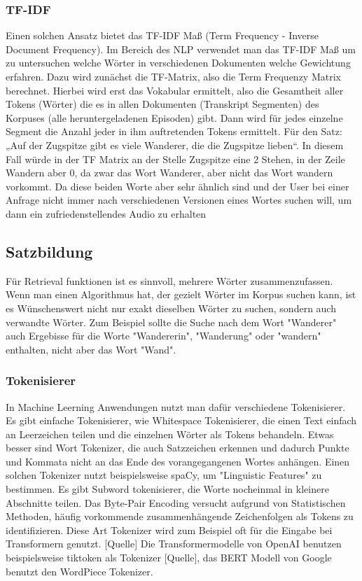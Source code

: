 \subsubsection{TF-IDF}

Einen solchen Ansatz bietet das TF-IDF Maß (Term Frequency - Inverse Document Frequency). 
Im Bereich des NLP verwendet man das TF-IDF Maß um zu untersuchen welche Wörter in verschiedenen Dokumenten welche Gewichtung erfahren. 
Dazu wird zunächst die TF-Matrix, also die Term Frequenzy Matrix berechnet. 
Hierbei wird erst das Vokabular ermittelt, also die Gesamtheit aller Tokens (Wörter) die es in allen Dokumenten (Transkript Segmenten) des Korpuses (alle heruntergeladenen Episoden) gibt. 
Dann wird für jedes einzelne Segment die Anzahl jeder in ihm auftretenden Tokens ermittelt. 
Für den Satz: „Auf der Zugspitze gibt es viele Wanderer, die die Zugspitze lieben“. 
In diesem Fall würde in der TF Matrix an der Stelle Zugspitze eine 2 Stehen, in der Zeile Wandern aber 0, da zwar das Wort Wanderer, aber nicht das Wort wandern vorkommt. 
Da diese beiden Worte aber sehr ähnlich sind und der User bei einer Anfrage nicht immer nach verschiedenen Versionen eines Wortes suchen will, um dann ein zufriedenstellendes Audio zu erhalten


\subsection{Satzbildung}

Für Retrieval funktionen ist es sinnvoll, mehrere Wörter zusammenzufassen.
Wenn man einen Algorithmus hat, der gezielt Wörter im Korpus suchen kann, ist es Wünschenswert nicht nur exakt dieselben Wörter zu suchen, sondern auch verwandte Wörter.
Zum Beispiel sollte die Suche nach dem Wort "Wanderer" auch Ergebisse für die Worte "Wandererin", "Wanderung" oder "wandern" enthalten, nicht aber das Wort "Wand".

\subsubsection{Tokenisierer}

In Machine Leerning Anwendungen nutzt man dafür verschiedene Tokenisierer.
Es gibt einfache Tokenisierer, wie Whitespace Tokenisierer, die einen Text einfach an Leerzeichen teilen und die einzelnen Wörter als Tokens behandeln.
Etwas besser sind Wort Tokenizer, die auch Satzzeichen erkennen und dadurch Punkte und Kommata nicht an das Ende des vorangegangenen Wortes anhängen. 
Einen solchen Tokenizer nutzt beispielsweise spaCy, um "Linguistic Features" zu bestimmen.
Es gibt Subword tokenisierer, die Worte nocheinmal in kleinere Abschnitte teilen.
Das Byte-Pair Encoding versucht aufgrund von Statistischen Methoden, häufig vorkommende zusammenhängende Zeichenfolgen als Tokens zu identifizieren.
Diese Art Tokenizer wird zum Beispiel oft für die Eingabe bei Transformern genutzt. [Quelle]
Die Transformermodelle von OpenAI benutzen beispielsweise tiktoken als Tokenizer [Quelle], das BERT Modell von Google benutzt den WordPiece Tokenizer.



